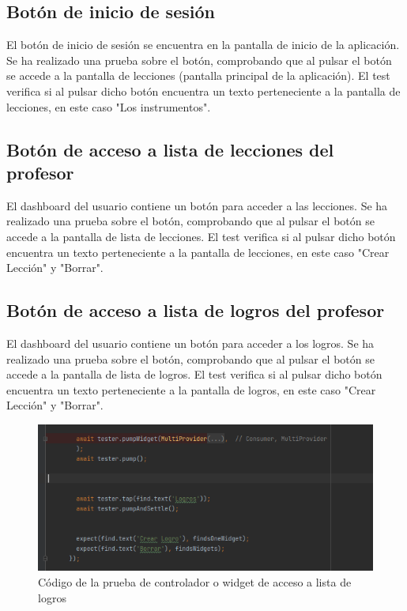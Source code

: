 \subsection{Botón de inicio de sesión}
\label{subsec:pruebas-controlador-boton-inicio-sesión}
El botón de inicio de sesión se encuentra en la pantalla de inicio de la aplicación. Se ha realizado una prueba sobre el botón, comprobando que al pulsar el botón se accede a la pantalla de lecciones (pantalla principal de la aplicación).
El test verifica si al pulsar dicho botón encuentra un texto perteneciente a la pantalla de lecciones, en este caso "Los instrumentos".

\subsection{Botón de acceso a lista de lecciones del profesor}
\label{subsec:pruebas-controlador-boton-lecciones}
El dashboard del usuario contiene un botón para acceder a las lecciones. Se ha realizado una prueba sobre el botón, comprobando que al pulsar el botón se accede a la pantalla de lista de lecciones. 
El test verifica si al pulsar dicho botón encuentra un texto perteneciente a la pantalla de lecciones, en este caso "Crear Lección" y "Borrar".

\subsection{Botón de acceso a lista de logros del profesor}
\label{subsec:pruebas-controlador-boton-logros}
El dashboard del usuario contiene un botón para acceder a los logros. Se ha realizado una prueba sobre el botón, comprobando que al pulsar el botón se accede a la pantalla de lista de logros. 
El test verifica si al pulsar dicho botón encuentra un texto perteneciente a la pantalla de logros, en este caso "Crear Lección" y "Borrar".
\begin{figure}[H]
    \centering
    \includegraphics[width=\textwidth]{imagenes/c8/pruebawidget1.png}
    \caption{Código de la prueba de controlador o widget de acceso a lista de logros}
    \label{fig:prueba_widget_lecciones}
\end{figure}


